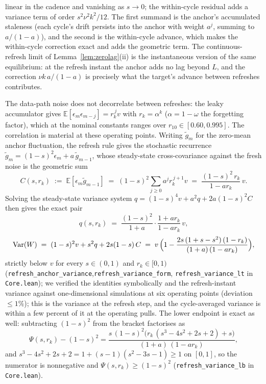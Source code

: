 linear in the cadence and vanishing as $s \to 0$; the within-cycle residual adds a variance term of order $s^2 \nu^2 k^2/12$.
The first summand is the anchor's accumulated staleness (each cycle's drift persists into the anchor with weight $a^j$, summing to $a/(1-a)$), and the second is the within-cycle advance, which makes the within-cycle correction exact and adds the geometric term.
The continuous-refresh limit of Lemma~\ref{lem:zerolag}(ii) is the instantaneous version of the same equilibrium: at the refresh instant the anchor adds no lag beyond $L$, and the correction $\nu k\,a/(1-a)$ is precisely what the target's advance between refreshes contributes.

The data-path noise does not decorrelate between refreshes: the leaky accumulator gives $\mathbb{E}[\epsilon_m \epsilon_{m-j}] = r_k^{\,j} v$ with $r_k = \alpha^k$ ($\alpha = 1-\omega$ the forgetting factor), which at the nominal constants ranges over $r_{10} \in [0.60, 0.995]$. The correlation is material at these operating points.
Writing $\tilde g_m$ for the zero-mean anchor fluctuation, the refresh rule gives the stochastic recurrence $\tilde g_m = (1-s)^2 \epsilon_m + a\,\tilde g_{m-1}$, whose steady-state cross-covariance against the fresh noise is the geometric sum
\[
  C(s,r_k) \;:=\; \mathbb{E}[\epsilon_m \tilde g_{m-1}]
  \;=\; (1-s)^2 \sum_{j \ge 0} a^j r_k^{\,j+1} v
  \;=\; \frac{(1-s)^2\,r_k}{1 - ar_k}\,v .
\]
Solving the steady-state variance system $q = (1-s)^4 v + a^2 q + 2a(1-s)^2 C$ then gives the exact pair
\[
  q(s,r_k) \;=\; \frac{(1-s)^2}{1+a}\cdot\frac{1+ar_k}{1-ar_k}\,v,
\]
\[
  \mathrm{Var}(W) \;=\; (1-s)^2 v + s^2 q + 2s(1-s)\,C
  \;=\; v\,\Bigl(1 - \frac{2s\,(1+s-s^2)\,(1-r_k)}{(1+a)\,(1-ar_k)}\Bigr),
\]
strictly below $v$ for every $s \in (0,1)$ and $r_k \in [0,1)$ (\texttt{refresh\_anchor\_variance},\newline\texttt{refresh\_variance\_form}, \texttt{refresh\_variance\_lt} in \texttt{Core.lean}); we verified the identities symbolically and the refresh-instant variance against one-dimensional simulations at six operating points (deviation $\le 1\%$); this is the variance at the refresh step, and the cycle-averaged variance is within a few percent of it at the operating pulls.
The lower endpoint is exact as well: subtracting $(1-s)^2$ from the bracket factorises as
\[
  \Psi(s,r_k)-(1-s)^2
  = \frac{s\,(1-s)^2\bigl(r_k\,(s^3-4s^2+2s+2)+s\bigr)}{(1+a)\,(1-ar_k)},
\]
and $s^3-4s^2+2s+2 = 1+(s-1)(s^2-3s-1) \ge 1$ on $[0,1]$, so the numerator is nonnegative and $\Psi(s,r_k)\ge(1-s)^2$ (\texttt{refresh\_variance\_lb} in \texttt{Core.lean}).
